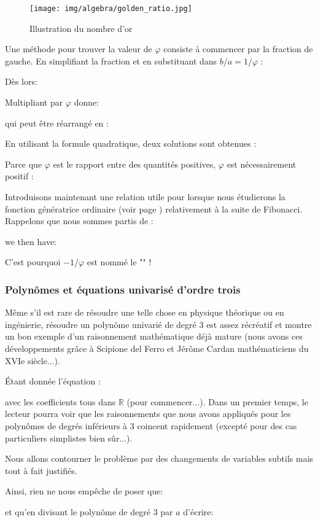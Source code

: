 	\begin{figure}[H]
		\centering
		\texttt{[image: img/algebra/golden\_ratio.jpg]}
		\caption{Illustration du nombre d'or}
	\end{figure}
	Une méthode pour trouver la valeur de $\varphi$ consiste à commencer par la fraction de gauche. En simplifiant la fraction et en substituant dans $b/a = 1/\varphi$ :
	
	Dès lors:
	
	Multipliant par $\varphi$ donne:
	
	qui peut être réarrangé en :
	
	En utilisant la formule quadratique, deux solutions sont obtenues :
	
	Parce que $\varphi$ est le rapport entre des quantités positives, $\varphi$ est nécessairement positif :
	
	Introduisons maintenant une relation utile pour lorsque nous étudierons la fonction génératrice ordinaire (voir page \pageref{ordinary generating function}) relativement à la suite de Fibonacci. Rappelons que nous sommes partis de :
	
	we then have:
	
	C'est pourquoi $-1/\varphi$ est nommé le "" !
	
	
	\subsubsection{Polynômes et équations univarisé d'ordre trois}
	Même s'il est rare de résoudre une telle chose en physique théorique ou en ingénierie, résoudre un polynôme univarié de degré $3$ est assez récréatif et montre un bon exemple d'un raisonnement mathématique déjà mature (nous avons ces développements grâce à Scipione del Ferro et Jérôme Cardan mathématiciens du XVIe siècle...).
	
	Étant donnée l'équation :
	
	avec les coefficients tous dans $\mathbb{R}$ (pour commencer...). Dans un premier temps, le lecteur pourra voir que les raisonnements que nous avons appliqués pour les polynômes de degrés inférieurs à $3$ coincent rapidement (excepté pour des cas particuliers simplistes bien sûr...).

	Nous allons contourner le problème par des changements de variables subtils mais tout à fait justifiés.
	
	Ainsi, rien ne nous empêche de poser que:
	
	et qu'en divisant le polynôme de degré $3$ par $a$ d'écrire:
	
